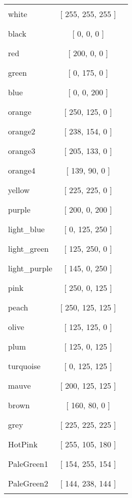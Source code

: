 \begin{tabular}{|l|c|c|}
white & [ 255, 255, 255 ] & \color{white} \rule{1cm}{1.5ex}\\
black & [ 0, 0, 0 ] & \color{black} \rule{1cm}{1.5ex}\\
red & [ 200, 0, 0 ] & \color{red} \rule{1cm}{1.5ex}\\
green & [ 0, 175, 0 ] & \color{green} \rule{1cm}{1.5ex}\\
blue & [ 0, 0, 200 ] & \color{blue} \rule{1cm}{1.5ex}\\
orange & [ 250, 125, 0 ] & \color{orange} \rule{1cm}{1.5ex}\\
orange2 & [ 238, 154, 0 ] & \color{orange2} \rule{1cm}{1.5ex}\\
orange3 & [ 205, 133, 0 ] & \color{orange3} \rule{1cm}{1.5ex}\\
orange4 & [ 139, 90, 0 ] & \color{orange4} \rule{1cm}{1.5ex}\\
yellow & [ 225, 225, 0 ] & \color{yellow} \rule{1cm}{1.5ex}\\
purple & [ 200, 0, 200 ] & \color{purple} \rule{1cm}{1.5ex}\\
light\_blue & [ 0, 125, 250 ] & \color{light_blue} \rule{1cm}{1.5ex}\\
light\_green & [ 125, 250, 0 ] & \color{light_green} \rule{1cm}{1.5ex}\\
light\_purple & [ 145, 0, 250 ] & \color{light_purple} \rule{1cm}{1.5ex}\\
pink & [ 250, 0, 125 ] & \color{pink} \rule{1cm}{1.5ex}\\
peach & [ 250, 125, 125 ] & \color{peach} \rule{1cm}{1.5ex}\\
olive & [ 125, 125, 0 ] & \color{olive} \rule{1cm}{1.5ex}\\
plum & [ 125, 0, 125 ] & \color{plum} \rule{1cm}{1.5ex}\\
turquoise & [ 0, 125, 125 ] & \color{turquoise} \rule{1cm}{1.5ex}\\
mauve & [ 200, 125, 125 ] & \color{mauve} \rule{1cm}{1.5ex}\\
brown & [ 160, 80, 0 ] & \color{brown} \rule{1cm}{1.5ex}\\
grey & [ 225, 225, 225 ] & \color{grey} \rule{1cm}{1.5ex}\\
HotPink & [ 255, 105, 180 ] & \color{HotPink} \rule{1cm}{1.5ex}\\
PaleGreen1 & [ 154, 255, 154 ] & \color{PaleGreen1} \rule{1cm}{1.5ex}\\
PaleGreen2 & [ 144, 238, 144 ] & \color{PaleGreen2} \rule{1cm}{1.5ex}\\

\end{tabular}
